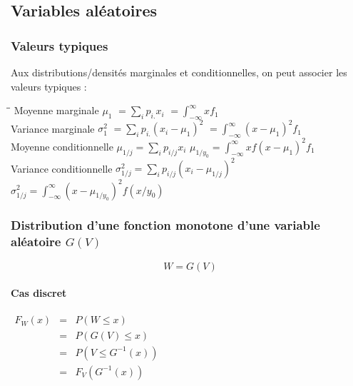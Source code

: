 \newpage
\subsection{Variables aléatoires}





\subsubsection{Valeurs typiques}
\label{valeurs-typiques}
Aux distributions/densités marginales et conditionnelles, on peut associer les valeurs typiques :
\begin{tabbing}
\hspace{5cm}\=\hspace{5cm}\=\kill
Moyenne marginale $\mu_1$       \> $= \displaystyle\sum_i p_{i.}x_i$            \> $= \displaystyle\int_{-\infty}^\infty xf_1$ \\ 
Variance marginale $\sigma_1^2$ \> $= \displaystyle\sum_i p_{i.} (x_i-\mu_1)^2$ \> $= \displaystyle\int_{-\infty}^\infty (x-\mu_1)^2 f_1$ \\
Moyenne conditionnelle          \> $\displaystyle\mu_{1/j} = \sum_i p_{i/j}x_i$              \> $\displaystyle\mu_{1/y_0} = \int_{-\infty}^\infty xf(x-\mu_1)^2f_1$\\
Variance conditionnelle         \> $\displaystyle\sigma^2_{1/j} = \sum_i p_{i/j}(x_i-\mu_{1/j})^2$ \> $\displaystyle\sigma^2_{1/j} = \int_{-\infty}^\infty (x - \mu_{1/y_0})^2 f(x/y_0)$\\
\end{tabbing}







\newpage
\subsubsection{Distribution d'une fonction monotone d'une variable aléatoire $G(V)$}
$$\boxed{W = G(V)}$$
\paragraph{Cas discret}
\begin{center}
	$\begin{array}{LLC}
    F_W(x)    &=& P(W \leq x) \\
              &=& P(G(V) \leq x) \\
              &=& P(V \leq G^{-1}(x)) \\
              &=& F_V(G^{-1}(x)) \\
	\end{array}$
\end{center}
